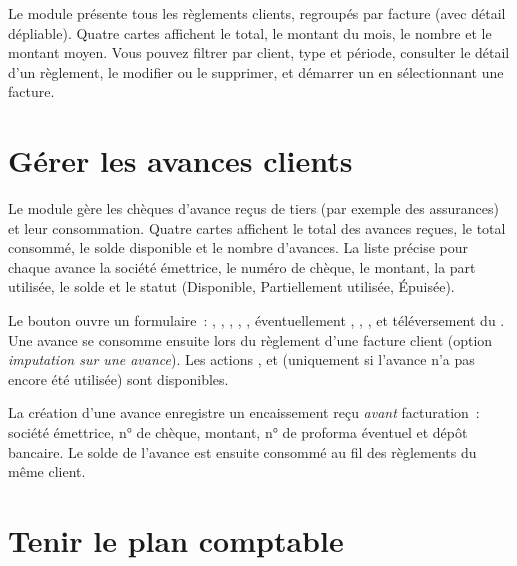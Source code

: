 Le module  présente tous les règlements clients, regroupés par facture (avec détail dépliable). Quatre cartes affichent le total, le montant du mois, le nombre et le montant moyen. Vous pouvez filtrer par client, type et période, consulter le détail d'un règlement, le modifier ou le supprimer, et démarrer un  en sélectionnant une facture.


\section{Gérer les avances clients}

Le module  gère les chèques d'avance reçus de tiers (par exemple des assurances) et leur consommation. Quatre cartes affichent le total des avances reçues, le total consommé, le solde disponible et le nombre d'avances. La liste précise pour chaque avance la société émettrice, le numéro de chèque, le montant, la part utilisée, le solde et le statut (Disponible, Partiellement utilisée, Épuisée).

Le bouton  ouvre un formulaire~: , , , , , éventuellement , , ,  et téléversement du . Une avance se consomme ensuite lors du règlement d'une facture client (option \emph{imputation sur une avance}). Les actions ,  et  (uniquement si l'avance n'a pas encore été utilisée) sont disponibles.


La création d'une avance enregistre un encaissement reçu \emph{avant} facturation~: société émettrice, n° de chèque, montant, n° de proforma éventuel et dépôt bancaire. Le solde de l'avance est ensuite consommé au fil des règlements du même client.

\section{Tenir le plan comptable}

